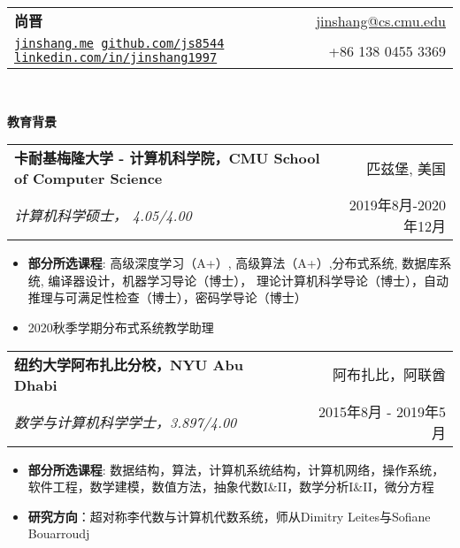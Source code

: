 \documentclass[letterpaper,11pt]{article}
\makeatletter
\newcommand{\resitem}[1]{\item  #1}
\newcommand{\resheading}[1]{{\large \colorbox{mygrey}{\begin{minipage}{\linewidth}{\textbf{#1 \vphantom{p\^{E}}}}\end{minipage}}}}
\newcommand{\ressubheading}[4]{
\begin{tabular*}{1.04\linewidth}{l@{\extracolsep{\fill}}r}
		\textbf{#1} & #2 \\
		\textit{#3} & #4 \\
\end{tabular*}\vspace{-6pt}}
\makeatother
\begin{document}
\newcommand{\mywebheader}{
\begin{tabular*}{7in}{l@{\extracolsep{\fill}}r}
	\textbf{{\LARGE 尚晋}} & \href{mailto:jinshang@cs.cmu.edu}{jinshang@cs.cmu.edu}\\
	{\footnotesize \texttt{\href{https://jinshang.me}{jinshang.me} \hspace{1em} \href{https://github.com/js8544}{github.com/js8544} \hspace{1em} \href{https://linkedin.com/in/jinshang1997}{linkedin.com/in/jinshang1997}}}& +86 138 0455 3369 \\
	\end{tabular*}
\\
\vspace{0.1in}}

\mywebheader

\resheading{教育背景}
	\begin{description}
		\item
			\ressubheading{卡耐基梅隆大学 - 计算机科学院，CMU School of Computer Science}{匹兹堡, 美国}{计算机科学硕士， 4.05/4.00} {2019年8月-2020年12月}
			{ \footnotesize
				\begin{itemize}
					\resitem{\textbf{部分所选课程}: 高级深度学习（A+）, 高级算法（A+）,分布式系统, 数据库系统, 编译器设计，机器学习导论（博士）， 理论计算机科学导论（博士），自动推理与可满足性检查（博士），密码学导论（博士）}
					\resitem{2020秋季学期分布式系统教学助理}
				\end{itemize}
				}
		\item
			\ressubheading{纽约大学阿布扎比分校，NYU Abu Dhabi}{阿布扎比，阿联酋}{数学与计算机科学学士，3.897/4.00} {2015年8月 - 2019年5月}
				{ \footnotesize
				\begin{itemize}
                    \resitem{\textbf{部分所选课程}: 数据结构，算法，计算机系统结构，计算机网络，操作系统，软件工程，数学建模，数值方法，抽象代数I\&II，数学分析I\&II，微分方程}
                    \resitem{\textbf{研究方向}：超对称李代数与计算机代数系统，师从Dimitry Leites与Sofiane Bouarroudj}
				\end{itemize}
				}
\begin{comment}
\end{comment}
	\end{description} %
\end{document}

